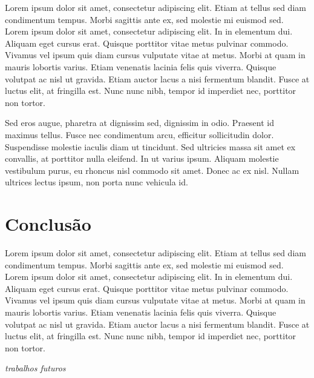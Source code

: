 \documentclass[12pt]{article}
\begin{document}
Lorem ipsum dolor sit amet, consectetur adipiscing elit. Etiam at tellus sed diam condimentum tempus. Morbi sagittis ante ex, sed molestie mi euismod sed. Lorem ipsum dolor sit amet, consectetur adipiscing elit. In in elementum dui. Aliquam eget cursus erat. Quisque porttitor vitae metus pulvinar commodo. Vivamus vel ipsum quis diam cursus vulputate vitae at metus. Morbi at quam in mauris lobortis varius. Etiam venenatis lacinia felis quis viverra. Quisque volutpat ac nisl ut gravida. Etiam auctor lacus a nisi fermentum blandit. Fusce at luctus elit, at fringilla est. Nunc nunc nibh, tempor id imperdiet nec, porttitor non tortor.

Sed eros augue, pharetra at dignissim sed, dignissim in odio. Praesent id maximus tellus. Fusce nec condimentum arcu, efficitur sollicitudin dolor. Suspendisse molestie iaculis diam ut tincidunt. Sed ultricies massa sit amet ex convallis, at porttitor nulla eleifend. In ut varius ipsum. Aliquam molestie vestibulum purus, eu rhoncus nisl commodo sit amet. Donec ac ex nisl. Nullam ultrices lectus ipsum, non porta nunc vehicula id. 

\section{Conclusão}

Lorem ipsum dolor sit amet, consectetur adipiscing elit. Etiam at tellus sed diam condimentum tempus. Morbi sagittis ante ex, sed molestie mi euismod sed. Lorem ipsum dolor sit amet, consectetur adipiscing elit. In in elementum dui. Aliquam eget cursus erat. Quisque porttitor vitae metus pulvinar commodo. Vivamus vel ipsum quis diam cursus vulputate vitae at metus. Morbi at quam in mauris lobortis varius. Etiam venenatis lacinia felis quis viverra. Quisque volutpat ac nisl ut gravida. Etiam auctor lacus a nisi fermentum blandit. Fusce at luctus elit, at fringilla est. Nunc nunc nibh, tempor id imperdiet nec, porttitor non tortor.

\textit{trabalhos futuros}



\end{document}
